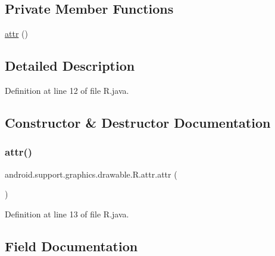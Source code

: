 \subsection*{Private Member Functions}
\begin{DoxyCompactItemize}
\item 
\mbox{\hyperlink{classandroid_1_1support_1_1graphics_1_1drawable_1_1_r_1_1attr_aa30e36906bf14403ab3c7b65f761cc0a}{attr}} ()
\end{DoxyCompactItemize}


\subsection{Detailed Description}


Definition at line 12 of file R.\+java.



\subsection{Constructor \& Destructor Documentation}
\mbox{\label{classandroid_1_1support_1_1graphics_1_1drawable_1_1_r_1_1attr_aa30e36906bf14403ab3c7b65f761cc0a}} 
\subsubsection{\texorpdfstring{attr()}{attr()}}
{\footnotesize\ttfamily android.\+support.\+graphics.\+drawable.\+R.\+attr.\+attr (\begin{DoxyParamCaption}{ }\end{DoxyParamCaption})\hspace{0.3cm}{\ttfamily [private]}}



Definition at line 13 of file R.\+java.


\begin{DoxyCode}{0}

\end{DoxyCode}


\subsection{Field Documentation}
\mbox{\label{classandroid_1_1support_1_1graphics_1_1drawable_1_1_r_1_1attr_a9a73a48a0e780ef66ff0ce470452bcb7}} 
